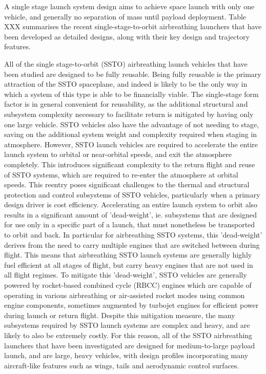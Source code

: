 A single stage launch system design aims to achieve space launch with only one vehicle, and generally no separation of mass until payload deployment. Table XXX summarises the recent single-stage-to-orbit airbreathing launchers that have been developed as detailed designs, along with their key design and trajectory features. 

All of the single stage-to-orbit (SSTO) airbreathing launch vehicles that have been studied are designed to be fully reusable. Being fully reusable is the primary attraction of the SSTO spaceplane, and indeed is likely to be the only way in which a system of this type is able to be financially viable. 
The single-stage form factor is in general convenient for reusability, as the additional structural and subsystem complexity necessary to facilitate return is mitigated by having only one large vehicle. SSTO vehicles also have the advantage of not needing to stage, saving on the additional system weight and complexity required when staging in atmosphere. 
However, SSTO launch vehicles are required to accelerate the entire launch system to orbital or near-orbital speeds, and exit the atmosphere completely. This introduces significant complexity to the return flight and reuse of SSTO systems, which are required to re-enter the atmosphere at orbital speeds\cite{NASP}. This reentry poses significant challenges to the thermal and structural protection and control subsystems of SSTO vehicles, particularly when a primary design driver is cost efficiency.
 Accelerating an entire launch system to orbit also results in a significant amount of 'dead-weight', ie. subsystems that are designed for use only in a specific part of a launch, that must nonetheless be transported to orbit and back. In particular for airbreathing SSTO systems, this 'dead-weight' derives from the need to carry multiple engines that are switched between during flight. This means that airbreathing SSTO launch systems are generally highly fuel efficient at all stages of flight, but carry heavy engines that are not used in all flight regimes. 
To mitigate this 'dead-weight', SSTO vehicles are generally powered by rocket-based combined cycle (RBCC) engines which are capable of operating in various airbreathing or air-assisted rocket modes using common engine components, sometimes augmented by turbojet engines for efficient power during launch or return flight. Despite this mitigation measure, the many subsystems required by SSTO launch systems are complex and heavy, and are likely to also be extremely costly.
For this reason, all of the SSTO airbreathing launchers that have been investigated are designed for medium-to-large payload launch, and are large, heavy vehicles, with design profiles incorporating many aircraft-like features such as wings, tails and aerodynamic control surfaces. 

